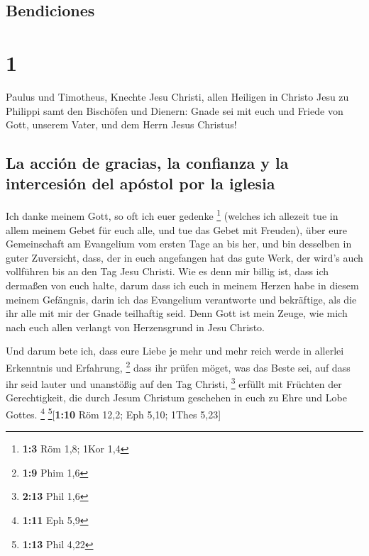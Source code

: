 \hypertarget{bendiciones}{%
\subsection{Bendiciones}\label{bendiciones}}

\hypertarget{section}{%
\section{1}\label{section}}

 Paulus und Timotheus, Knechte Jesu Christi, allen
Heiligen in Christo Jesu zu Philippi samt den Bischöfen und Dienern:
 Gnade sei mit euch und Friede von Gott, unserem Vater,
und dem Herrn Jesus Christus!

\hypertarget{la-acciuxf3n-de-gracias-la-confianza-y-la-intercesiuxf3n-del-apuxf3stol-por-la-iglesia}{%
\subsection{La acción de gracias, la confianza y la intercesión del
apóstol por la
iglesia}\label{la-acciuxf3n-de-gracias-la-confianza-y-la-intercesiuxf3n-del-apuxf3stol-por-la-iglesia}}

 Ich danke meinem Gott, so oft ich euer gedenke
\footnote{\textbf{1:3} Röm 1,8; 1Kor 1,4}  (welches ich
allezeit tue in allem meinem Gebet für euch alle, und tue das Gebet mit
Freuden),  über eure Gemeinschaft am Evangelium vom ersten
Tage an bis her,  und bin desselben in guter Zuversicht,
dass, der in euch angefangen hat das gute Werk, der wird's auch
vollführen bis an den Tag Jesu Christi.  Wie es denn mir
billig ist, dass ich dermaßen von euch halte, darum dass ich euch in
meinem Herzen habe in diesem meinem Gefängnis, darin ich das Evangelium
verantworte und bekräftige, als die ihr alle mit mir der Gnade
teilhaftig seid.  Denn Gott ist mein Zeuge, wie mich nach
euch allen verlangt von Herzensgrund in Jesu Christo.

 Und darum bete ich, dass eure Liebe je mehr und mehr
reich werde in allerlei Erkenntnis und Erfahrung, \footnote{\textbf{1:9}
  Phim 1,6}  dass ihr prüfen möget, was das Beste sei,
auf dass ihr seid lauter und unanstößig auf den Tag Christi, \footnote{\textbf{2:13}
  Phil 1,6}  erfüllt mit Früchten der Gerechtigkeit, die
durch Jesum Christum geschehen in euch zu Ehre und Lobe Gottes.
\footnote{\textbf{1:11} Eph 5,9} \footnote{\textbf{1:13} Phil 4,22}{[}\textbf{1:10}
Röm 12,2; Eph 5,10; 1Thes 5,23{]}


